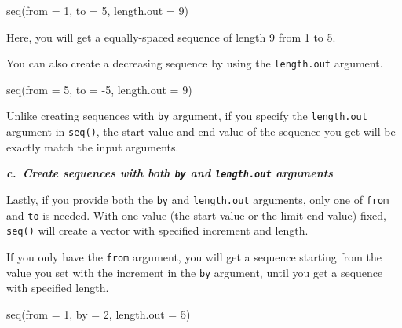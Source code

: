 \documentclass[
]{book}
\newenvironment{Shaded}{\begin{snugshade}}{\end{snugshade}}
\newcommand{\AttributeTok}[1]{\textcolor[rgb]{0.77,0.63,0.00}{#1}}
\newcommand{\DecValTok}[1]{\textcolor[rgb]{0.00,0.00,0.81}{#1}}
\newcommand{\FunctionTok}[1]{\textcolor[rgb]{0.00,0.00,0.00}{#1}}
\newcommand{\NormalTok}[1]{#1}
\newcommand{\SpecialCharTok}[1]{\textcolor[rgb]{0.00,0.00,0.00}{#1}}
\newenvironment{blackbox}{
  \definecolor{shadecolor}{rgb}{0, 0, 0}  %
  \color{white}
  \begin{shaded}}
 {\end{shaded}}
\newenvironment{infobox}[1]
  {
  \begin{itemize}
  \renewcommand{\labelitemi}{
    \raisebox{-.7\height}[0pt][0pt]{
      {\setkeys{Gin}{width=3em,keepaspectratio}
        \texttt{[image: pics/\#1]}}
    }
  }
  \setlength{\fboxsep}{1em}
  \begin{blackbox}
  \item
  }
  {
  \end{blackbox}
  \end{itemize}
  }
\begin{document}
\begin{Shaded}
\begin{Highlighting}[]
\FunctionTok{seq}\NormalTok{(}\AttributeTok{from =} \DecValTok{1}\NormalTok{, }\AttributeTok{to =} \DecValTok{5}\NormalTok{, }\AttributeTok{length.out =} \DecValTok{9}\NormalTok{) }
\end{Highlighting}
\end{Shaded}

Here, you will get a equally-spaced sequence of length 9 from 1 to 5.

You can also create a decreasing sequence by using the \texttt{length.out} argument.

\begin{Shaded}
\begin{Highlighting}[]
\FunctionTok{seq}\NormalTok{(}\AttributeTok{from =} \DecValTok{5}\NormalTok{, }\AttributeTok{to =} \SpecialCharTok{{-}}\DecValTok{5}\NormalTok{, }\AttributeTok{length.out =} \DecValTok{9}\NormalTok{) }
\end{Highlighting}
\end{Shaded}

\begin{infobox}{caution}
Unlike creating sequences with \texttt{by} argument, if you specify the \texttt{length.out} argument in \texttt{seq()}, the start value and end value of the sequence you get will be exactly match the input arguments.

\end{infobox}

\textbf{\emph{c.~Create sequences with both \texttt{by} and \texttt{length.out} arguments}}

Lastly, if you provide both the \texttt{by} and \texttt{length.out} arguments, only one of \texttt{from} and \texttt{to} is needed. With one value (the start value or the limit end value) fixed, \texttt{seq()} will create a vector with specified increment and length.

If you only have the \texttt{from} argument, you will get a sequence starting from the value you set with the increment in the \texttt{by} argument, until you get a sequence with specified length.

\begin{Shaded}
\begin{Highlighting}[]
\FunctionTok{seq}\NormalTok{(}\AttributeTok{from =} \DecValTok{1}\NormalTok{, }\AttributeTok{by =} \DecValTok{2}\NormalTok{, }\AttributeTok{length.out =} \DecValTok{5}\NormalTok{)}
\end{Highlighting}
\end{Shaded}
\end{document}
